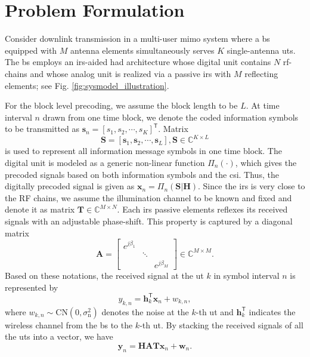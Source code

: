 \documentclass[12pt,draftclsnofoot,onecolumn,journal]{IEEEtran}
\begin{document}
\section{Problem Formulation}
Consider downlink transmission in a multi-user \ac{mimo} system where a \ac{bs} equipped with $M$ antenna elements simultaneously serves $K$ single-antenna \acp{ut}. The \ac{bs} employs an \ac{irs}-aided \ac{had} architecture whose digital unit contains $N$ \ac{rf}-chains and whose analog unit is realized via a passive \ac{irs} with $M$ reflecting elements; see Fig. \ref{fig:sysmodel_illustration}. 

For the block level precoding, we assume the block length to be $L$. At time interval $n$ drawn from one time block, we denote the coded information symbols to be transmitted as $\mathbf{s}_n=\left[ s_1, s_2, \cdots, s_K \right]^{\mathsf{T}}$. Matrix 
\begin{equation}
\mathbf S=\left[ \mathbf s_1, \mathbf s_2, \cdots,  \mathbf s_L\right], \mathbf S\in\mathbb C^{K\times L}
\end{equation}
 is used to represent all information message symbols in one time block. The digital unit is modeled as a generic non-linear function $\Pi_n(\cdot)$, which gives the precoded signals based on both information symbols and the \ac{csi}. Thus, the digitally precoded signal is given as $\mathbf x_n=\Pi_n(\mathbf S|\mathbf H)$. Since the \ac{irs} is very close to the RF chains, we assume the illumination channel to be known and fixed and denote it as matrix $\mathbf T\in\mathbb C^{M\times N}$. Each \ac{irs} passive elements reflexes its received signals with an adjustable phase-shift. This property is captured by a diagonal matrix 
\begin{equation}
\mathbf A=
\begin{bmatrix}
e^{j\beta_1} & & \\
&\ddots &\\
& & e^{j\beta_M}
\end{bmatrix}\in\mathbb C^{M\times M}.
\end{equation}
Based on these notations, the received signal at the \ac{ut} $k$ in symbol interval $n$ is represented by
\begin{equation}
y_{k,n} =\mathbf{h}_{k}^{\mathsf{T}} \mathbf{x}_n+ w_{k,n},
\end{equation}
where $w_{k,n}\sim\mathrm{CN}(0, \sigma_{\mathrm n}^2)$ denotes the noise at the $k$-th \ac{ut} and $\mathbf{h}_{k}^{\mathsf{T}}$ indicates the wireless channel from the \ac{bs} to the $k$-th \ac{ut}. By stacking the received signals of all the \acp{ut} into a vector, we have
\begin{equation}
\mathbf{y}_{n} =\mathbf{H}\mathbf A\mathbf T \mathbf{x}_n+ \mathbf{w}_{n}.
\end{equation}
\end{document}
